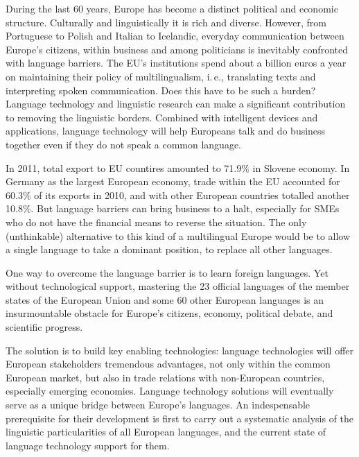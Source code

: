 \cleardoublepage



\begin{multicols}{2}

During the last 60 years, Europe has become a distinct political and economic structure. Culturally and linguistically it is rich and diverse. However, from Portuguese to Polish and Italian to Icelandic, everyday communication between Europe’s citizens, within business and among politicians is inevitably confronted with language barriers. The EU's institutions spend about a billion euros a year on maintaining their policy of multilingualism, i.\,e., translating texts and interpreting spoken communication. Does this have to be such a burden? Language technology and linguistic research can make a significant contribution to removing the linguistic borders. Combined with intelligent devices and applications, language technology will help Europeans talk and do business together even if they do not speak a common language. 

In 2011, total export to EU countires amounted to 71.9\%  in Slovene economy. In Germany as the largest European economy, trade within the EU accounted for 60.3\% of its exports in 2010, and with other European countries totalled another 10.8\%. But language barriers can bring business to a halt, especially for SMEs who do not have the financial means to reverse the situation. The only (unthinkable) alternative to this kind of a multilingual Europe would be to allow a single language to take a dominant position, to replace all other languages. 

One way to overcome the language barrier is to learn foreign languages. Yet without technological support, mastering the 23 official languages of the member states of the European Union and some 60 other European languages is an insurmountable obstacle for Europe’s citizens, economy, political debate, and scientific progress. %

The solution is to build key enabling technologies: language technologies will offer European stakeholders tremendous advantages, not only within the common European market, but also in trade relations with non-European countries, especially emerging economies. Language technology solutions will eventually serve as a unique bridge between Europe's languages. An indespensable prerequisite for their development is first to carry out a systematic analysis of the linguistic particularities of all European languages, and the current state of language technology support for them.  %


\end{multicols}
